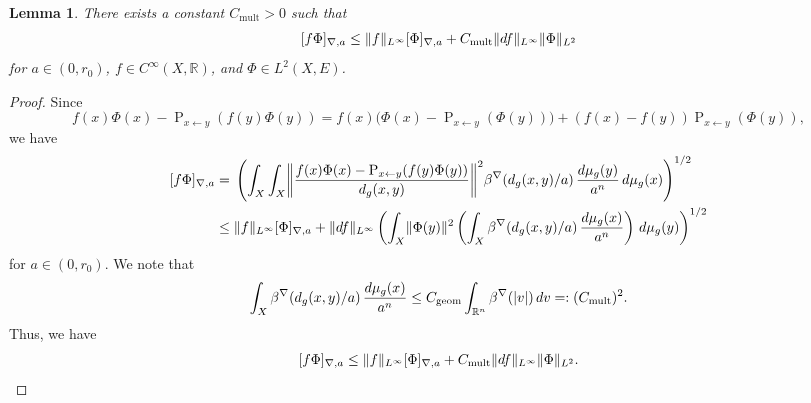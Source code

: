\documentclass[a4paper,oneside,12pt]{amsart}
\theoremstyle{plain}
\newtheorem{lemma}[theorem]{Lemma}
\theoremstyle{definition}
\theoremstyle{remark}
\newcommand{\R}{\mathbb{R}}
\DeclarePairedDelimiter{\abs}{\lvert}{\rvert}
\DeclarePairedDelimiter{\norm}{\lVert}{\rVert}
\DeclarePairedDelimiter{\seminorm}{\lbrack}{\rbrack}
\newcommand{\dvol}{d\mu}
\newcommand{\paralleltransport}[2]{\operatorname{P}_{#2 \gets #1}}
\newcommand{\Ltwonorm}[2][L^2]{\norm{#2}_{#1}}
\newcommand{\mesoscopicdifferenceseminorm}[2][a]{\seminorm{#2}_{\nabla,#1}}
\newcommand{\cutoff}{\beta}
\newcommand{\cutoffnabla}{\cutoff^{\nabla}}
\newcommand{\constantgeometric}{C_{\mathrm{geom}}}
\newcommand{\constantmult}{C_{\mathrm{mult}}}
\begin{document}
\begin{lemma}\label{lemma: multiplication and difference seminorm}
  There exists a constant $\constantmult > 0$ such that
  \begin{equation}
    \mesoscopicdifferenceseminorm{f\Phi} \le \norm{f}_{L^{\infty}} \mesoscopicdifferenceseminorm{\Phi} + \constantmult \norm{df}_{L^{\infty}} \Ltwonorm{\Phi}
  \end{equation}
  for $a \in (0,r_0)$, $f \in C^{\infty}(X,\R)$, and $\Phi \in L^2(X,E)$.
\end{lemma}
\begin{proof}
  Since
  \begin{equation}
    f(x)\Phi(x) - \paralleltransport{y}{x}(f(y)\Phi(y)) = f(x)\bigl(\Phi(x) - \paralleltransport{y}{x}(\Phi(y))\bigr) + (f(x)-f(y)) \paralleltransport{y}{x}(\Phi(y)),
  \end{equation}
  we have
  \begin{equation}
    \begin{aligned}
    \mesoscopicdifferenceseminorm{f\Phi} ={}& \left(\int_X \int_X \norm*{\frac{f(x)\Phi(x) - \paralleltransport{y}{x}(f(y)\Phi(y))}{d_g(x,y)}}^2 \cutoffnabla(d_g(x,y)/a) \,\frac{\dvol_g(y)}{a^n} \,\dvol_g(x)\right)^{1/2} \\
    \le{}& \norm{f}_{L^{\infty}} \mesoscopicdifferenceseminorm{\Phi} + \norm{df}_{L^{\infty}} \left( \int_X \norm{\Phi(y)}^2 \left( \int_X \cutoffnabla(d_g(x,y)/a) \,\frac{\dvol_g(x)}{a^n} \right) \,\dvol_g(y) \right)^{1/2}
    \end{aligned}
  \end{equation}
  for $a \in (0,r_0)$.
  We note that
  \begin{equation}
    \int_X \cutoffnabla(d_g(x,y)/a) \,\frac{\dvol_g(x)}{a^n} \le \constantgeometric \int_{\R^n} \cutoffnabla(\abs{v}) \,dv =: (\constantmult)^2.
  \end{equation}
  Thus, we have
  \begin{equation}
    \mesoscopicdifferenceseminorm{f\Phi} \le \norm{f}_{L^{\infty}} \mesoscopicdifferenceseminorm{\Phi} + \constantmult \norm{df}_{L^{\infty}} \Ltwonorm{\Phi}.
  \end{equation}
\end{proof}
\end{document}
